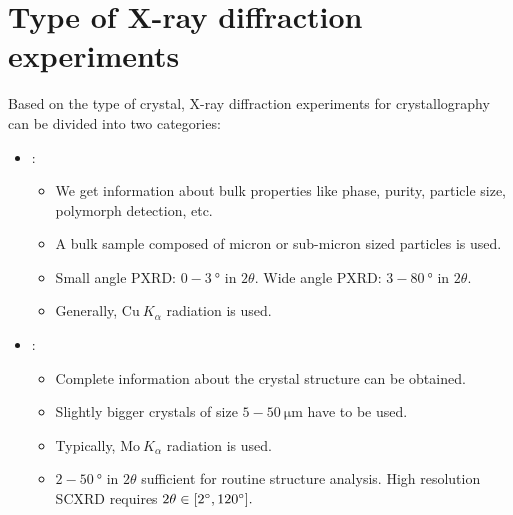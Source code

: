 \section{Type of X-ray diffraction experiments}

Based on the type of crystal, X-ray diffraction experiments for crystallography can be divided into two categories:%
%	
	\begin{itemize}%
%	
	    \item {}:%
%	    	
	    	\begin{itemize}[label={$\rightarrowtail$}]%
%	    	
	    	    \item We get information about bulk properties like phase, purity, particle size, polymorph detection, etc.
	    	    
	    	    \item A bulk sample composed of micron or sub-micron sized particles is used.
	    	    
	    	    \item Small angle PXRD: $0-3~\si{\degree}$ in $2\theta.$ Wide angle PXRD: $3-80~\si{\degree}$ in $2\theta.$
	    	    
	    	    \item Generally, $\mathrm{Cu}~K_\alpha$ radiation is used.
	    	    
	    	\end{itemize}
	    	
	    \item {}:%
%	    	
	    	\begin{itemize}[label={$\rightarrowtail$}]%
%	    	
	    	    \item Complete information about the crystal structure can be obtained.
	    	    
	    	    \item Slightly bigger crystals of size $5-50~\si{\micro\metre}$ have to be used.
	    	    
	    	    \item Typically, $\mathrm{Mo}~K_\alpha$ radiation is used.
	    	    
	    	    \item $2-50~\si{\degree}$ in $2\theta$ sufficient for routine structure analysis. High resolution SCXRD requires $2\theta \in \qty[ \SI{2}{\degree}, \SI{120}{\degree} ].$
	    	    
	    	\end{itemize}
	    
	\end{itemize}
	
